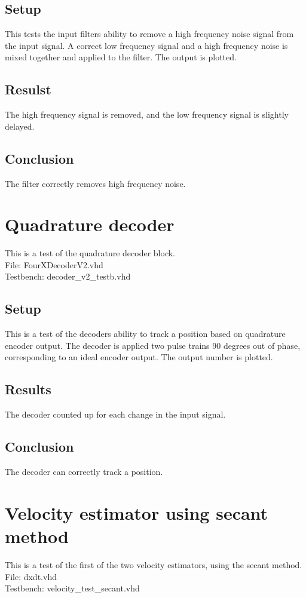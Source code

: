 \subsection{Setup}
This tests the input filters ability to remove a high frequency noise signal from the input signal.
A correct low frequency signal and a high frequency noise is mixed together and applied to the filter. The output is plotted.
\subsection*{Resulst}
The high frequency signal is removed, and the low frequency signal is slightly delayed.
\subsection*{Conclusion}
The filter correctly removes high frequency noise.

\section{Quadrature decoder}
This is a test of the quadrature decoder block.\\
File: FourXDecoderV2.vhd\\
Testbench: decoder\_v2\_testb.vhd
\subsection*{Setup}
This is a test of the decoders ability to track a position based on quadrature encoder output.
The decoder is applied two pulse trains 90 degrees out of phase, corresponding to an ideal encoder output. The output number is plotted.
\subsection*{Results}
The decoder counted up for each change in the input signal.
\subsection*{Conclusion}
The decoder can correctly track a position.

\section{Velocity estimator using secant method}
This is a test of the first of the two velocity estimators, using the secant method.\\
File: dxdt.vhd\\
Testbench: velocity\_test\_secant.vhd
